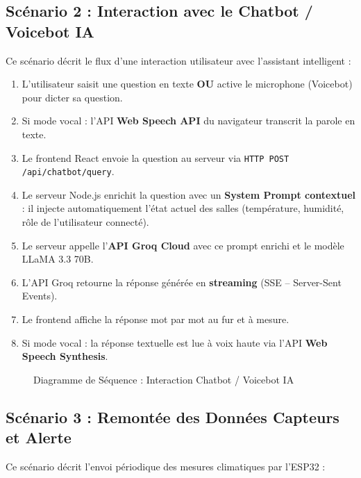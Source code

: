 \documentclass[12pt,a4paper]{report}
\begin{document}
\subsection{Scénario 2 : Interaction avec le Chatbot / Voicebot IA}
Ce scénario décrit le flux d'une interaction utilisateur avec l'assistant intelligent :

\begin{enumerate}
    \item L'utilisateur saisit une question en texte \textbf{OU} active le microphone (Voicebot) pour dicter sa question.
    \item Si mode vocal : l'API \textbf{Web Speech API} du navigateur transcrit la parole en texte.
    \item Le frontend React envoie la question au serveur via \texttt{HTTP POST /api/chatbot/query}.
    \item Le serveur Node.js enrichit la question avec un \textbf{System Prompt contextuel} : il injecte automatiquement l'état actuel des salles (température, humidité, rôle de l'utilisateur connecté).
    \item Le serveur appelle l'\textbf{API Groq Cloud} avec ce prompt enrichi et le modèle LLaMA 3.3 70B.
    \item L'API Groq retourne la réponse générée en \textbf{streaming} (SSE -- Server-Sent Events).
    \item Le frontend affiche la réponse mot par mot au fur et à mesure.
    \item Si mode vocal : la réponse textuelle est lue à voix haute via l'API \textbf{Web Speech Synthesis}.
\end{enumerate}

\begin{figure}[h]
    \centering
    \caption{Diagramme de Séquence : Interaction Chatbot / Voicebot IA}
\end{figure}

\subsection{Scénario 3 : Remontée des Données Capteurs et Alerte}
Ce scénario décrit l'envoi périodique des mesures climatiques par l'ESP32 :
\end{document}
